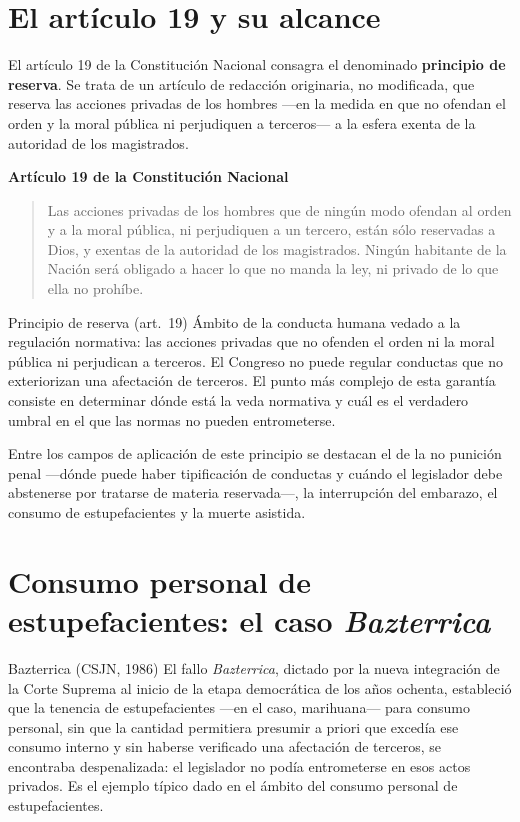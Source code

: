 \documentclass[12pt,oneside]{book}
\newenvironment{normacitada}[1]{%
    \medskip
    \noindent\textbf{#1}\par\smallskip
    \begin{quote}\itshape
}{%
    \end{quote}
    \medskip
}
\begin{document}
\section{El artículo 19 y su alcance}

El artículo 19 de la Constitución Nacional consagra el denominado \textbf{principio de reserva}. Se trata de un artículo de redacción originaria, no modificada, que reserva las acciones privadas de los hombres —en la medida en que no ofendan el orden y la moral pública ni perjudiquen a terceros— a la esfera exenta de la autoridad de los magistrados.

\begin{normacitada}{Artículo 19 de la Constitución Nacional}
Las acciones privadas de los hombres que de ningún modo ofendan al orden y a la moral pública, ni perjudiquen a un tercero, están sólo reservadas a Dios, y exentas de la autoridad de los magistrados. Ningún habitante de la Nación será obligado a hacer lo que no manda la ley, ni privado de lo que ella no prohíbe.
\end{normacitada}

\begin{definition}{Principio de reserva (art.\ 19)}
Ámbito de la conducta humana vedado a la regulación normativa: las acciones privadas que no ofenden el orden ni la moral pública ni perjudican a terceros. El Congreso no puede regular conductas que no exteriorizan una afectación de terceros. El punto más complejo de esta garantía consiste en determinar dónde está la veda normativa y cuál es el verdadero umbral en el que las normas no pueden entrometerse.
\end{definition}

Entre los campos de aplicación de este principio se destacan el de la no punición penal —dónde puede haber tipificación de conductas y cuándo el legislador debe abstenerse por tratarse de materia reservada—, la interrupción del embarazo, el consumo de estupefacientes y la muerte asistida.

\section{Consumo personal de estupefacientes: el caso \emph{Bazterrica}}

\begin{example}{Bazterrica (CSJN, 1986)}
El fallo \emph{Bazterrica}, dictado por la nueva integración de la Corte Suprema al inicio de la etapa democrática de los años ochenta, estableció que la tenencia de estupefacientes —en el caso, marihuana— para consumo personal, sin que la cantidad permitiera presumir a priori que excedía ese consumo interno y sin haberse verificado una afectación de terceros, se encontraba despenalizada: el legislador no podía entrometerse en esos actos privados. Es el ejemplo típico dado en el ámbito del consumo personal de estupefacientes.
\end{example}
\end{document}
